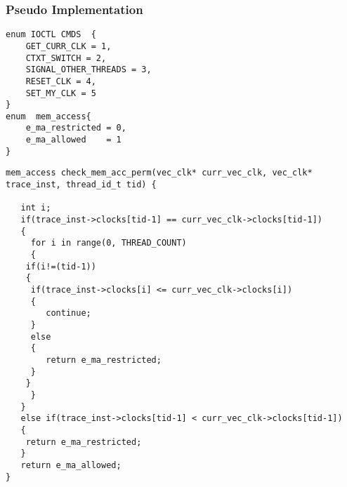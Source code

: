 

\newpage
\subsubsection*{Pseudo Implementation}
\begin{lstlisting}[title=Data Types Section used by user space and kernel space, style=customc]
enum IOCTL CMDS  { 
	GET_CURR_CLK = 1, 
  	CTXT_SWITCH = 2, 
  	SIGNAL_OTHER_THREADS = 3,
  	RESET_CLK = 4,
  	SET_MY_CLK = 5
}
enum  mem_access{
	e_ma_restricted = 0,
	e_ma_allowed 	= 1
} 
\end{lstlisting}

\begin{lstlisting}[title=Check Permission for memory access, style=customc]
mem_access check_mem_acc_perm(vec_clk* curr_vec_clk, vec_clk* trace_inst, thread_id_t tid) {

   int i;
   if(trace_inst->clocks[tid-1] == curr_vec_clk->clocks[tid-1]) 
   {
     for i in range(0, THREAD_COUNT) 
     {
	if(i!=(tid-1)) 
	{
	 if(trace_inst->clocks[i] <= curr_vec_clk->clocks[i]) 
	 {
	 	continue;
	 }
	 else 
	 {
	 	return e_ma_restricted;
	 }
	}
     }
   }
   else if(trace_inst->clocks[tid-1] < curr_vec_clk->clocks[tid-1]) 
   {
   	return e_ma_restricted;
   }
   return e_ma_allowed;
}

\end{lstlisting}


